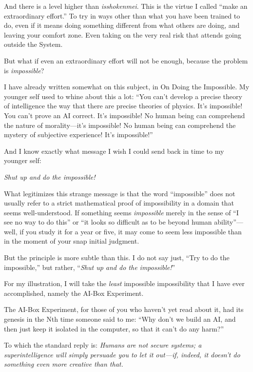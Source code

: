 {
 And there is a level higher than \textit{isshokenmei}. This is the
virtue I called ``make an extraordinary
effort.'' To try in ways other than what you have
been trained to do, even if it means doing something different from
what others are doing, and leaving your comfort zone. Even taking on
the very real risk that attends going outside the System.}

{
 But what if even an extraordinary effort will not be enough,
because the problem is \textit{impossible}?}

{
 I have already written somewhat on this subject, in On Doing the
Impossible. My younger self used to whine about this a lot:
``You can't develop a precise theory
of intelligence the way that there are precise theories of physics.
It's impossible! You can't prove an AI
correct. It's impossible! No human being can comprehend
the nature of morality---it's impossible! No human
being can comprehend the mystery of subjective experience!
It's impossible!''}

{
 And I know exactly what message I wish I could send back in time
to my younger self:}

{
 \textit{Shut up and do the impossible!}}

{
 What legitimizes this strange message is that the word
``impossible'' does not usually
refer to a strict mathematical proof of impossibility in a domain that
seems well-understood. If something seems \textit{impossible} merely in
the sense of ``I see no way to do
this'' or ``it looks so difficult as
to be beyond human ability''---well, if you study it
for a year or five, it may come to seem less impossible than in the
moment of your snap initial judgment.}

{
 But the principle is more subtle than this. I do not say just,
``Try to do the impossible,'' but
rather, ``\textit{Shut up and do the
impossible!}''}

{
 For my illustration, I will take the \textit{least} impossible
impossibility that I have ever accomplished, namely the AI-Box
Experiment.}

{
 The AI-Box Experiment, for those of you who
haven't yet read about it, had its genesis in the Nth
time someone said to me: ``Why don't
we build an AI, and then just keep it isolated in the computer, so that
it can't do any harm?''}

{
 To which the standard reply is: \textit{Humans are not secure
systems; a superintelligence will simply persuade you to let it
out---if, indeed, it doesn't do something even more
creative than that.}}

